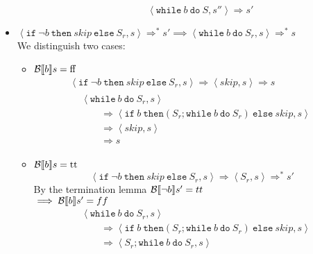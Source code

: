 \begin{exercise}
\begin{itemize}
\begin{itemize}
\begin{itemize}
                    \[ \left<\texttt{while}\ b\ \texttt{do}\ S, s''\right> \Rightarrow s' \]
                \end{itemize}
            \end{itemize}
        \item $\left<\texttt{if}\ \neg b\ \texttt{then}\ skip\ \texttt{else}\ S_r, s\right> \Rightarrow^* s' \implies \left<\texttt{while}\ b\ \texttt{do}\ S_r, s\right> \Rightarrow^* s$ \\
            We distinguish two cases:
            \begin{itemize}
                \item $\mathcal{B} \llbracket  b \rrbracket s = \text{ff}$
                \begin{gather*}
                    \left<\texttt{if}\ \neg b\ \texttt{then}\ skip\ \texttt{else}\ S_r, s\right>
                    \Rightarrow
                    \left<skip, s\right>
                    \Rightarrow s
                    \\
                    \begin{align*}
                        &\left<\texttt{while}\ b\ \texttt{do}\ S_r, s\right>
                        \\&\qquad\Rightarrow \left<\texttt{if}\ b\ \texttt{then} (S_r; \texttt{while}\ b\ \texttt{do}\ S_r)\ \texttt{else}\ skip, s\right>
                        \\&\qquad\Rightarrow \left<skip, s\right>
                        \\&\qquad\Rightarrow s
                    \end{align*}
                \end{gather*}
                \item $\mathcal{B} \llbracket  b \rrbracket s = \text{tt}$
                \[
                    \left<\texttt{if}\ \neg b\ \texttt{then}\ skip\ \texttt{else}\ S_r, s\right>
                    \Rightarrow
                    \left<S_r, s\right>
                    \Rightarrow^* s'
                \]
                By the termination lemma $\mathcal{B} \llbracket  \neg b \rrbracket s' = tt$ \\
                $\implies \mathcal{B} \llbracket  b \rrbracket s' = ff$
                \begin{align*}
                    &\left<\texttt{while}\ b\ \texttt{do}\ S_r, s\right>
                    \\&\qquad\Rightarrow \left<\texttt{if}\ b\ \texttt{then} (S_r; \texttt{while}\ b\ \texttt{do}\ S_r)\ \texttt{else}\ skip, s\right>
                    \\&\qquad\Rightarrow \left<S_r; \texttt{while}\ b\ \texttt{do}\ S_r, s\right>

\end{align*}
\end{itemize}
\end{itemize}
\end{exercise}
